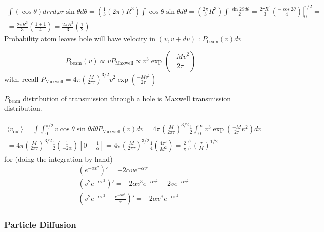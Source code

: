 \[
\begin{gathered}
  \int (\cos{\theta}) dr rd\varphi r \sin{\theta} d\theta = (\frac{1}{3} (2\pi ) R^3) \int \cos{\theta} \sin{\theta} d\theta = ( \frac{2\pi}{3} R^3) \int \frac{\sin{2\theta} d\theta}{ 2 } = \frac{2\pi R^3}{3} \left. \left( \frac{ - \cos{2\theta} }{4} \right) \right|_0^{\pi/2} = \\
  = \frac{ 2\pi R^3}{3} \left( \frac{1+ 1}{4} \right) = \frac{ 2\pi R^3}{3} \left( \frac{1}{2} \right)
\end{gathered}
\]
Probability atom leaves hole will have velocity in $(v,v+dv)$ : $P_{\text{beam}}(v) dv$

\[
P_{\text{beam}}(v) \propto vP_{\text{Maxwell} } \propto v^3 \exp{ \left( \frac{ -Mv^2}{ 2\tau } \right) }
\]
with, recall $P_{\text{Maxwell}} = 4\pi \left( \frac{ M }{ 2\pi \tau } \right)^{3/2} v^2 \exp{ \left( \frac{-Mv^2}{ 2\tau } \right) }$ 

$P_{\text{beam}}$ distribution of transmission through a hole is Maxwell transmission distribution. 

\[
\begin{gathered}
  \langle v_{\text{out}} \rangle = \int \int_0^{\pi/2} v\cos{\theta} \sin{\theta} d\theta P_{\text{Maxwell}}(v) dv = 4\pi \left( \frac{ M}{ 2\pi \tau} \right)^{3/2} \frac{1}{2} \int_0^{\infty} v^3 \exp{ \left( \frac{-M}{2\tau} v^2 \right) } dv = \\
  = 4\pi \left( \frac{M}{2\pi \tau} \right)^{3/2} \frac{1}{2} \left( \frac{1}{-2\alpha} \right) \left[ 0 - \frac{1}{\alpha} \right] = 4\pi \left( \frac{ M}{2\pi \tau} \right)^{3/2} \frac{1}{4} \left( \frac{4\tau^2}{M^2} \right) = \boxed{ \frac{ 2^{1/2} }{ \pi^{1/2} } \left( \frac{\tau}{M} \right)^{1/2} }
\end{gathered}
\]
for (doing the integration by hand) 
\[
\begin{aligned}
  & (e^{-\alpha v^2} )' = -2\alpha v e^{-\alpha v^2} \\
  & (v^2 e^{-\alpha v^2} )' = -2\alpha v^3 e^{-\alpha v^2} + 2v e^{-\alpha v^2} \\ 
  & (v^2 e^{-\alpha v^2} + \frac{e^{-\alpha v^2} }{ \alpha } )' = -2\alpha v^3 e^{-\alpha v^2}
\end{aligned}
\]




\subsubsection*{Particle Diffusion}

